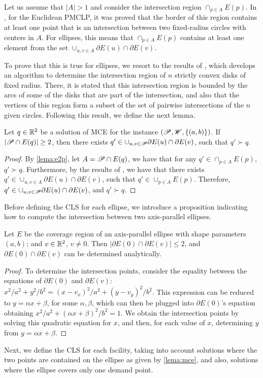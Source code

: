 Let us assume that $|A|>1$ and consider the intersection region $\cap_{p\in A} E(p)$. 
In \cite{church:1984}, for the Euclidean PMCLP, it was proved that the border of this region contains at least one point that is an intersection between two fixed-radius circles with centers in $A$. For ellipses, this means that $ \cap_{p\in A} E(p)$ contains at least one element from the set $\cup_{u, v \in A}\partial E(u) \cap \partial E(v)$. 

To prove that this is true for ellipses, we resort to the results of \cite{bi}, which develops an algorithm to determine the intersection region of $n$ strictly convex disks of fixed radius. There, it is stated that this intersection region is bounded by the arcs of some of the disks that are part of the intersection, and also that the vertices of this region form a subset of the set of pairwise intersections of the $n$ given circles.
Following this result, we define the next lemma.

\begin{lem}\label{lema:mce}
	Let $q\in \mathbb{R}^2$ be a solution of MCE for the instance $(\mathscr{P}, \mathscr{W}, \{(a, b)\})$.
	If $|\mathscr{P} \cap E(q)|\ge 2$, then there exists $q' \in \cup_{u, v \in \mathscr{P}}\partial E(u) \cap \partial E(v)$, such that $q' \succ q$.
\end{lem}
\begin{proof}
	By \autoref{lema:e2p}, let $A=\mathscr{P} \cap E(q)$, we have that for any $q' \in \cap_{p\in A} E(p)$, $q' \succ q$. 
	Furthermore, by the results of \cite{bi}, we have that there exists $q' \in \cup_{u, v \in A}\partial E(u) \cap \partial E(v)$, such that $q' \in \cup_{p\in A} E(p)$. 
	Therefore, $q' \in \cup_{u, v \in \mathscr{P}}\partial E(u) \cap \partial E(v)$, and $q' \succ q$.
\end{proof}

Before defining the CLS for each ellipse, we introduce a proposition indicating how to compute the intersection between two axis-parallel ellipses.

\begin{prp}\label{lema:e2p}
	Let $E$ be the coverage region of an axis-parallel ellipse with shape parameters $(a,b)$; and $v \in \mathbb{R}^2$, $v\neq0$. Then $|\partial E(0) \cap \partial E(v)| \le 2$, and $\partial E(0) \cap \partial E(v)$ can be determined analytically.
\end{prp}

\begin{proof}
	To determine the intersection points, consider the equality between the equations of $\partial E(0)$ and $\partial E(v)$:
	$x^2/a^2 + y^2/b^2 = (x-v_x)^2/a^2 + (y-v_y)^2/b^2.$
	This expression can be reduced to $y=\alpha x + \beta$, for some $\alpha, \beta$, which can then be plugged into $\partial E(0)$'s equation obtaining $x^2/a^2 + (\alpha x + \beta)^2/b^2 = 1$.
	We obtain the intersection points by solving this quadratic equation for $x$, and then, for each value of $x$,  determining $y$ from $y=\alpha x + \beta$.
\end{proof}
Next, we define the CLS for each facility, taking into account solutions where the two points are contained on the ellipse as given by \autoref{lema:mce}, and also, solutions where the ellipse covers only one demand point.

